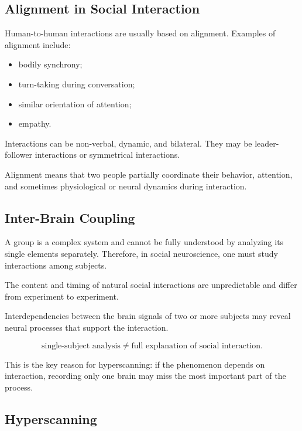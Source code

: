 \subsection{Alignment in Social Interaction}

Human-to-human interactions are usually based on alignment. Examples of alignment include:

\begin{itemize}[noitemsep]
    \item bodily synchrony;
    \item turn-taking during conversation;
    \item similar orientation of attention;
    \item empathy.
\end{itemize}

Interactions can be non-verbal, dynamic, and bilateral. They may be leader-follower interactions or symmetrical interactions.

\begin{authornote}
Alignment means that two people partially coordinate their behavior, attention, and sometimes physiological or neural dynamics during interaction.
\end{authornote}

\subsection{Inter-Brain Coupling}

A group is a complex system and cannot be fully understood by analyzing its single elements separately. Therefore, in social neuroscience, one must study interactions among subjects.

The content and timing of natural social interactions are unpredictable and differ from experiment to experiment.

Interdependencies between the brain signals of two or more subjects may reveal neural processes that support the interaction.

\[
\text{single-subject analysis}
\neq
\text{full explanation of social interaction}.
\]

\begin{authornote}
This is the key reason for hyperscanning: if the phenomenon depends on interaction, recording only one brain may miss the most important part of the process.
\end{authornote}

\subsection{Hyperscanning}

